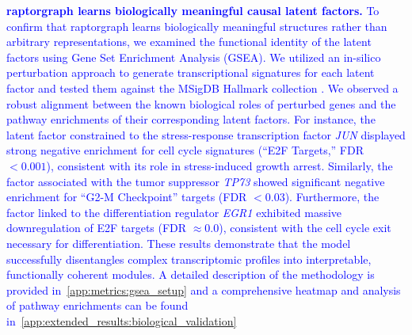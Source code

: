\documentclass{article}
\begin{document}
\textcolor{blue}{\textbf{\gls{raptorgraph} learns biologically meaningful causal latent factors.} To confirm that \gls{raptorgraph} learns biologically meaningful structures rather than arbitrary representations, we examined the functional identity of the latent factors using Gene Set Enrichment Analysis (GSEA).
We utilized an in-silico perturbation approach to generate transcriptional signatures for each latent factor and tested them against the MSigDB Hallmark collection \citep{liberzon_molecular_2015}.
We observed a robust alignment between the known biological roles of perturbed genes and the pathway enrichments of their corresponding latent factors.
For instance, the latent factor constrained to the stress-response transcription factor \textit{JUN} displayed strong negative enrichment for cell cycle signatures (``E2F Targets,'' FDR $< 0.001$), consistent with its role in stress-induced growth arrest.
Similarly, the factor associated with the tumor suppressor \textit{TP73} showed significant negative enrichment for ``G2-M Checkpoint'' targets (FDR $< 0.03$).
Furthermore, the factor linked to the differentiation regulator \textit{EGR1} exhibited massive downregulation of E2F targets (FDR $\approx 0.0$), consistent with the cell cycle exit necessary for differentiation.
These results demonstrate that the model successfully disentangles complex transcriptomic profiles into interpretable, functionally coherent modules.
A detailed description of the methodology is provided in~\cref{app:metrics:gsea_setup} and a comprehensive heatmap and analysis of pathway enrichments can be found in~\cref{app:extended_results:biological_validation}}


\end{document}
